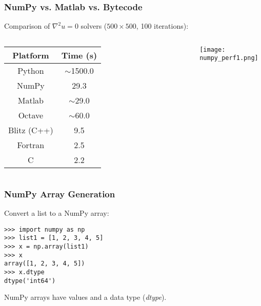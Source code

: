 \begin{frame}[fragile]\frametitle{NumPy vs. Matlab vs. Bytecode}

    Comparison of $\nabla^2 u = 0$ solvers ($500\times500$, 100 iterations):
    
    \begin{columns}
        \begin{table}
            \begin{tabular}{|c|c|}
                \hline
                Platform & Time (s) \\
                \hline \hline
                Python & $\sim$1500.0 \\
                \hline
                NumPy & 29.3 \\
                \hline
                Matlab & $\sim$29.0 \\
                \hline
                Octave & $\sim$60.0 \\
                \hline
                Blitz (C++) & 9.5 \\
                \hline
                Fortran & 2.5 \\
                \hline
                C & 2.2 \\
                \hline
            \end{tabular}
        \end{table}
        \begin{center}
            \texttt{[image: numpy\_perf1.png]}
        \end{center}
    \end{columns}

%
\end{frame}

\begin{frame}[fragile]\frametitle{NumPy Array Generation}

    Convert a list to a NumPy array:
    \begin{lstlisting}
>>> import numpy as np
>>> list1 = [1, 2, 3, 4, 5]
>>> x = np.array(list1)
>>> x
array([1, 2, 3, 4, 5])
>>> x.dtype
dtype('int64')
    \end{lstlisting}
    NumPy arrays have values and a data type (\textit{dtype}).
\end{frame}

